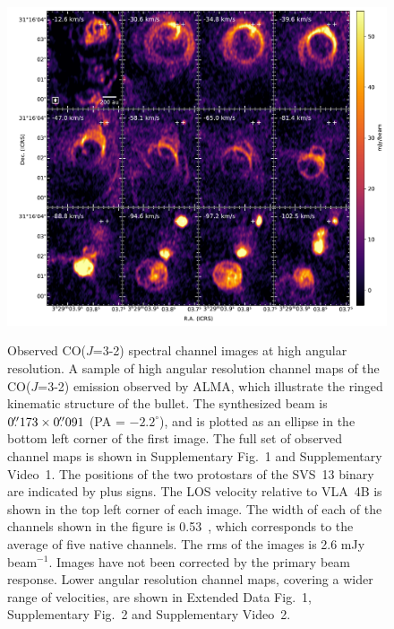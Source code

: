\documentclass[12pt]{mythesis}
\begin{document}
\begin{figure}[p!]
\begin{center}
\includegraphics[width=1.0\textwidth]{figures/channels_hr.pdf}\\
\caption[Selection of high resolution channel maps]{
Observed CO($J$=3-2) spectral channel images at high angular resolution. A sample of high angular resolution channel maps of the CO($J$=3-2) emission observed by ALMA, which illustrate the ringed kinematic structure of the bullet. The synthesized beam is $0\mbox{$.\!\!^{\prime\prime}$}173 \times 0\mbox{$.\!\!^{\prime\prime}$}091$ (PA = $-2.2^\circ$), and is plotted as an ellipse in the bottom left corner of the first image. The full set of observed channel maps is shown in Supplementary Fig.~1 and Supplementary Video~1.
The positions of the two protostars of the SVS~13 binary
 are indicated by plus signs. The LOS velocity relative to VLA~4B is shown in the top left corner of each image. The width of each of the channels shown in the figure is 0.53~\kms, which corresponds to the average of five native channels. The rms of the images is 2.6 mJy beam$^{-1}$. Images have not been corrected by the primary beam response.
Lower angular resolution channel maps, covering a wider range of velocities, are shown in Extended Data Fig.~1, Supplementary Fig.~2 and Supplementary Video~2. 
\label{fig:channels}}%
\end{center}
 \end{figure}
\end{document}
